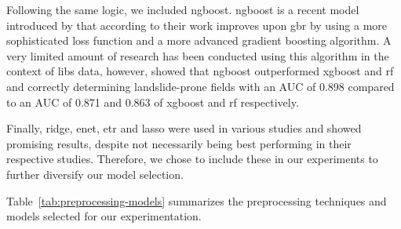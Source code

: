 Following the same logic, we included \gls{ngboost}. 
\gls{ngboost} is a recent model introduced by \citet{duan_ngboost_2020} that according to their work improves upon \gls{gbr} by using a more sophisticated loss function and a more advanced gradient boosting algorithm.
A very limited amount of research has been conducted using this algorithm in the context of \gls{libs} data, however, \citet{ngboost_landslide} showed that \gls{ngboost} outperformed \gls{xgboost} and \gls{rf} and correctly determining landslide-prone fields with an AUC of 0.898 compared to an AUC of 0.871 and 0.863 of \gls{xgboost} and \gls{rf} respectively.

Finally, \gls{ridge}, \gls{enet}, \gls{etr} and \gls{lasso} were used in various studies and showed promising results, despite not necessarily being best performing in their respective studies.
Therefore, we chose to include these in our experiments to further diversify our model selection. 

Table~\ref{tab:preprocessing-models} summarizes the preprocessing techniques and models selected for our experimentation.

